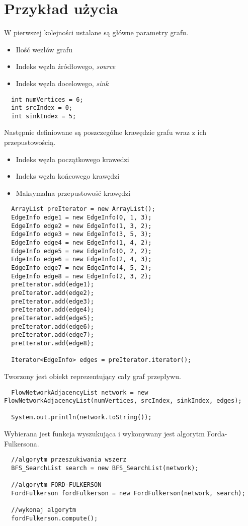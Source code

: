 \documentclass[10pt]{minutes}
\begin{document}
\section{Przykład użycia}
W pierwszej kolejności ustalane są główne parametry grafu.
\begin{itemize}
\item Ilość wezłów grafu
\item Indeks węzła źródłowego, \emph{source}
\item Indeks węzła docelowego, \emph{sink}
\end{itemize}
\begin{lstlisting}        
  int numVertices = 6; 
  int srcIndex = 0; 
  int sinkIndex = 5;
\end{lstlisting}

Następnie definiowane są poszczególne krawędzie grafu wraz z ich przepustowością.
\begin{itemize}
\item Indeks węzła początkowego krawedzi
\item Indeks węzła końcowego krawędzi
\item Maksymalna przepustowość krawędzi
\end{itemize}
\begin{lstlisting}
  ArrayList preIterator = new ArrayList();
  EdgeInfo edge1 = new EdgeInfo(0, 1, 3);
  EdgeInfo edge2 = new EdgeInfo(1, 3, 2);
  EdgeInfo edge3 = new EdgeInfo(3, 5, 3);
  EdgeInfo edge4 = new EdgeInfo(1, 4, 2);
  EdgeInfo edge5 = new EdgeInfo(0, 2, 2);
  EdgeInfo edge6 = new EdgeInfo(2, 4, 3);
  EdgeInfo edge7 = new EdgeInfo(4, 5, 2);
  EdgeInfo edge8 = new EdgeInfo(2, 3, 2);
  preIterator.add(edge1);
  preIterator.add(edge2);
  preIterator.add(edge3);
  preIterator.add(edge4);
  preIterator.add(edge5);
  preIterator.add(edge6);
  preIterator.add(edge7);
  preIterator.add(edge8);
                               
  Iterator<EdgeInfo> edges = preIterator.iterator();  
\end{lstlisting}
 
Tworzony jest obiekt reprezentujący cały graf przepływu.
\begin{lstlisting}      
  FlowNetworkAdjacencyList network = new FlowNetworkAdjacencyList(numVertices, srcIndex, sinkIndex, edges);  
        
  System.out.println(network.toString());
\end{lstlisting}

Wybierana jest funkcja wyszukująca i wykonywany jest algorytm Forda-Fulkersona.
\begin{lstlisting}
  //algorytm przeszukiwania wszerz
  BFS_SearchList search = new BFS_SearchList(network);

  //algorytm FORD-FULKERSON
  FordFulkerson fordFulkerson = new FordFulkerson(network, search);

  //wykonaj algorytm
  fordFulkerson.compute();
\end{lstlisting}
\end{document}
